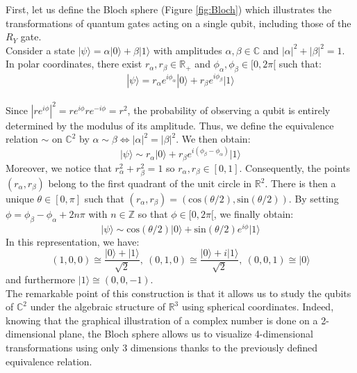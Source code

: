 First, let us define the Bloch sphere (Figure \ref{fig:Bloch}) which illustrates the transformations of quantum gates acting on a single qubit, including those of the $R_Y$ gate.
\\
Consider a state $|\psi \rangle =\alpha |0\rangle +\beta |1\rangle$ with amplitudes $\alpha ,\beta \in \mathbb{C}$ and $|\alpha|^{2}+|\beta |^{2}=1$. In polar coordinates, there exist $r_{\alpha}, r_{\beta} \in \mathbb{R}_+$ and $\phi_{\alpha}, \phi_{\beta} \in [0,2\pi[$ such that:
\[|\psi \rangle = r_{\alpha}e^{i\phi_{\alpha}}|0\rangle + r_{\beta}e^{i\phi_{\beta}} |1\rangle\]
\\
Since $|re^{i\phi}|^2 = re^{i\phi}re^{-i\phi} = r^2$, the probability of observing a qubit is entirely determined by the modulus of its amplitude. Thus, we define the equivalence relation $\sim$ on $\mathbb{C}^2$ by $\alpha \sim \beta \iff |\alpha|^2=|\beta|^2$. We then obtain:
\[|\psi \rangle \sim r_{\alpha}|0\rangle + r_{\beta}e^{i(\phi_{\beta}-\phi_{\alpha})} |1\rangle\]
Moreover, we notice that $r_{\alpha}^2+r_{\beta}^2=1$ so $r_{\alpha}, r_{\beta} \in [0,1]$. Consequently, the points $(r_{\alpha}, r_{\beta})$ belong to the first quadrant of the unit circle in $\mathbb{R}^2$. There is then a unique $\theta \in [0,\pi]$ such that $(r_{\alpha}, r_{\beta}) = (\mathrm{cos}(\theta/2),\mathrm{sin}(\theta/2))$. By setting $\phi = \phi_{\beta}-\phi_{\alpha} + 2n\pi$ with $n \in \mathbb{Z}$ so that $\phi \in [0,2\pi[$, we finally obtain:
\[|\psi \rangle \sim \mathrm{cos}(\theta/2)|0\rangle + \mathrm{sin}(\theta/2)e^{i\phi}|1\rangle\]
In this representation, we have:
\[(1,0,0) \cong \frac{|0\rangle+|1\rangle}{\sqrt{2}}, \ (0,1,0) \cong \frac{|0\rangle+i|1\rangle}{\sqrt{2}}, \ (0,0,1) \cong |0\rangle\]
and furthermore $|1\rangle \cong (0,0,-1)$.
\\
The remarkable point of this construction is that it allows us to study the qubits of $\mathbb{C}^2$ under the algebraic structure of $\mathbb{R}^3$ using spherical coordinates. Indeed, knowing that the graphical illustration of a complex number is done on a 2-dimensional plane, the Bloch sphere allows us to visualize 4-dimensional transformations using only 3 dimensions thanks to the previously defined equivalence relation.

